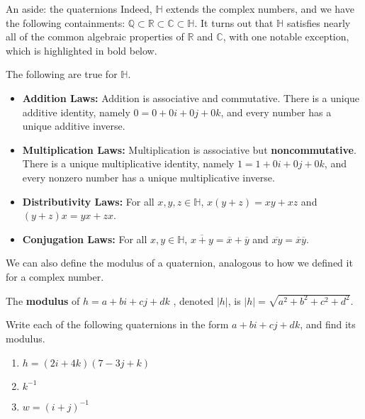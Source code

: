 \begin{section}{An aside: the quaternions}
Indeed, $\mathbb{H}$ extends the complex numbers, and we have the following containments: $\mathbb{Q}\subset\mathbb{R}\subset\mathbb{C}\subset\mathbb{H}$. It turns out that $\mathbb{H}$ satisfies nearly all of the common algebraic properties of $\mathbb{R}$ and $\mathbb{C}$, with one notable exception, which is highlighted in bold below.

\begin{fact}\label{fact.QuaternionLaws} The following are true for $\mathbb{H}$.
\begin{itemize}
\item \textbf{Addition Laws:} Addition is associative and commutative. There is a unique additive identity, namely $0 = 0 + 0i+0j+0k$, and every number has a unique additive inverse.
\item \textbf{Multiplication Laws:} Multiplication is associative but \textbf{noncommutative}. There is a unique multiplicative identity, namely $1 = 1 + 0i+0j+0k$, and every nonzero number has a unique multiplicative inverse.
\item \textbf{Distributivity Laws:} For all $x,y,z \in \mathbb{H}$, $x(y+z) = xy+xz$ and $(y+z)x = yx+zx$.
\item \textbf{Conjugation Laws:} For all $x,y \in \mathbb{H}$, $\overline{x+y} = \overline{x} + \overline{y}$ and $\overline{xy} = \overline{x}\overline{y}$.
\end{itemize}
\end{fact}

We can also define the modulus of a quaternion, analogous to how we defined it for a complex number.

\begin{definition}
The \textbf{modulus} of $h=a + bi+ cj + dk$ , denoted $|h|$, is $|h| = \sqrt{a^2 + b^2+c^2+d^2}$. 
\end{definition}

\begin{problem}\label{prob.QuaternionCheckin}
Write each of the following quaternions in the form $a+bi+cj+dk$, and find its modulus.
\begin{multicols}{2}
\begin{enumerate}
\item $h = (2i+4k)(7-3j+k)$
\item $k^{-1}$
\item $w = (i+j)^{-1}$
\end{enumerate}
\end{multicols}
\end{problem}


\end{section}
